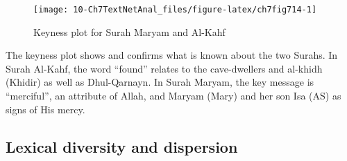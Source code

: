 \documentclass[
]{article}
\newenvironment{Shaded}{\begin{snugshade}}{\end{snugshade}}
\newcommand{\AttributeTok}[1]{\textcolor[rgb]{0.13,0.29,0.53}{#1}}
\newcommand{\CommentTok}[1]{\textcolor[rgb]{0.56,0.35,0.01}{\textit{#1}}}
\newcommand{\ConstantTok}[1]{\textcolor[rgb]{0.56,0.35,0.01}{#1}}
\newcommand{\DecValTok}[1]{\textcolor[rgb]{0.00,0.00,0.81}{#1}}
\newcommand{\FunctionTok}[1]{\textcolor[rgb]{0.13,0.29,0.53}{\textbf{#1}}}
\newcommand{\NormalTok}[1]{#1}
\newcommand{\OtherTok}[1]{\textcolor[rgb]{0.56,0.35,0.01}{#1}}
\newcommand{\SpecialCharTok}[1]{\textcolor[rgb]{0.81,0.36,0.00}{\textbf{#1}}}
\newcommand{\StringTok}[1]{\textcolor[rgb]{0.31,0.60,0.02}{#1}}
\begin{document}
\begin{Shaded}
\end{Shaded}

\begin{figure}

{\centering \texttt{[image: 10-Ch7TextNetAnal\_files/figure-latex/ch7fig714-1]} 

}

\caption{Keyness plot for Surah Maryam and Al-Kahf}\label{fig:ch7fig714}
\end{figure}

The keyness plot shows and confirms what is known about the two Surahs. In Surah Al-Kahf, the word ``found'' relates to the cave-dwellers and al-khidh (Khidir) as well as Dhul-Qarnayn. In Surah Maryam, the key message is ``merciful'', an attribute of Allah, and Maryam (Mary) and her son Isa (AS) as signs of His mercy.

\hypertarget{lexical-diversity-and-dispersion}{%
\subsection{Lexical diversity and dispersion}\label{lexical-diversity-and-dispersion}}
\end{document}
